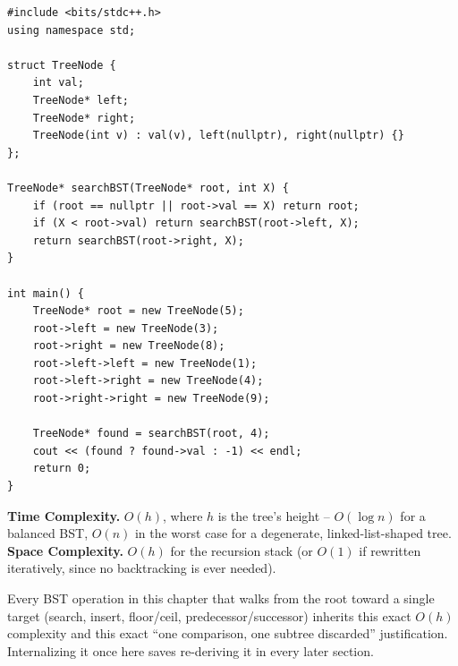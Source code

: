 \begin{lstlisting}
#include <bits/stdc++.h>
using namespace std;

struct TreeNode {
    int val;
    TreeNode* left;
    TreeNode* right;
    TreeNode(int v) : val(v), left(nullptr), right(nullptr) {}
};

TreeNode* searchBST(TreeNode* root, int X) {
    if (root == nullptr || root->val == X) return root;
    if (X < root->val) return searchBST(root->left, X);
    return searchBST(root->right, X);
}

int main() {
    TreeNode* root = new TreeNode(5);
    root->left = new TreeNode(3);
    root->right = new TreeNode(8);
    root->left->left = new TreeNode(1);
    root->left->right = new TreeNode(4);
    root->right->right = new TreeNode(9);

    TreeNode* found = searchBST(root, 4);
    cout << (found ? found->val : -1) << endl;
    return 0;
}
\end{lstlisting}

\begin{complexitybox}
\textbf{Time Complexity.} $O(h)$, where $h$ is the tree's height --
$O(\log n)$ for a balanced BST, $O(n)$ in the worst case for a
degenerate, linked-list-shaped tree.
\textbf{Space Complexity.} $O(h)$ for the recursion stack (or $O(1)$ if
rewritten iteratively, since no backtracking is ever needed).
\end{complexitybox}

\begin{takeawaybox}
Every BST operation in this chapter that walks from the root toward a
single target (search, insert, floor/ceil, predecessor/successor)
inherits this exact $O(h)$ complexity and this exact ``one comparison,
one subtree discarded'' justification. Internalizing it once here saves
re-deriving it in every later section.
\end{takeawaybox}
